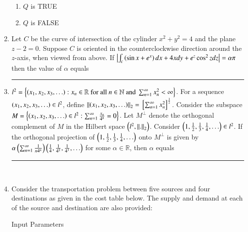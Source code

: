 \documentclass[journal]{IEEEtran}
\begin{document}
\begin{enumerate}
{\begin{multicols}{4}
\begin{enumerate}
\item $Q$ is TRUE
\item $Q$ is FALSE
\end{enumerate}
\end{multicols}}
\item{
Let $C$ be the curve of intersection of the cylinder $x^2+y^2=4$ and the plane $z-2=0$. Suppose $C$ is oriented in the counterclockwise direction around the $z$-axis, when viewed from above. If $\left\vert\int_c\left(\sin x+e^x\right)dx+4xdy+e^z\cos^2zdz\right\vert=\alpha\pi$ then the value of $\alpha$ equals \rule{2cm}{0.15mm}
}
\item{
$l^2 = \left\{\left(x_1, x_2, x_3, \ldots\right) : x_n \in \mathbb{R} \text{ for all } n \in \mathbb{N} \text{ and } \sum_{n=1}^{\infty} x_n^2 < \infty\right\}$.
For a sequence $\left(x_1, x_2, x_3, \ldots\right) \in l^2$, define $\left\lVert\left(x_1, x_2, x_3, \ldots\right)\right\rVert_2 = {}\left[\sum_{n=1}^{\infty} x_n^2\right]^{\frac{1}{2}}$.
Consider the subspace $ M = \left\{\left(x_1, x_2, x_3, \ldots\right) \in l^2 : \sum_{n=1}^{\infty} \frac{x_n}{4^n} = 0\right\} $. Let $M^\perp$ denote the orthogonal complement of $M$ in the Hilbert space $\left(l^2,\left\lVert.\right\rVert_2\right)$. Consider $\left(1,\frac{1}{2},\frac{1}{3},\frac{1}{4},\hdots\right)\in l^2$. If the orthogonal projection of $\left(1,\frac{1}{2},\frac{1}{3},\frac{1}{4},\hdots\right)$ onto $M^\perp$ is given by $\alpha\left(\sum_{n=1}^{\infty}\frac{1}{n4^n}\right)\left(\frac{1}{4},\frac{1}{	4^2},\frac{1}{4^3},\hdots\right)$ for some $\alpha\in\mathbb{R}$, then $\alpha$ equals \rule{2cm}{0.15mm}\\
}
\item{
Consider the transportation problem between five sources and four destinations as given in the cost table below. The supply and demand at each of the source and destination are also provided:
\begin{table}[h!]    
  \centering
  
  \caption{Input Parameters}
\end{table}

}
\end{enumerate}
\end{document}
